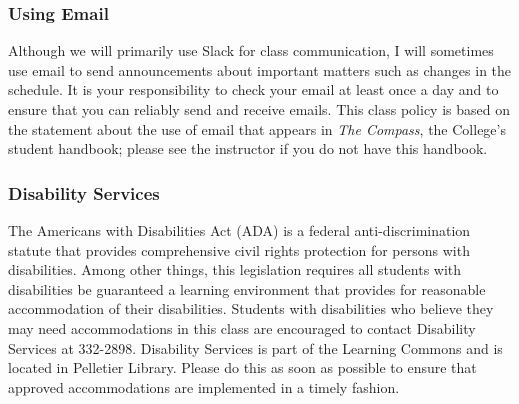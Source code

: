 \documentclass[11pt]{article}
\begin{document}
\subsubsection*{Using Email}

Although we will primarily use Slack for class communication, I will sometimes use email to send announcements about
important matters such as changes in the schedule. It is your responsibility to check your email at least once a day and to
ensure that you can reliably send and receive emails. This class policy is based on the statement about the use of email that
appears in {\em The Compass}, the College's student handbook; please see the instructor if you do not have this
handbook.



\subsubsection*{Disability Services}

The Americans with Disabilities Act (ADA) is a federal anti-discrimination statute that provides comprehensive civil
rights protection for persons with disabilities. Among other things, this legislation requires all students with
disabilities be guaranteed a learning environment that provides for reasonable accommodation of their disabilities.
Students with disabilities who believe they may need accommodations in this class are encouraged to contact Disability
Services at 332-2898. Disability Services is part of the Learning Commons and is located in Pelletier Library.
Please do this as soon as possible to ensure that approved accommodations are implemented in a timely fashion.
\end{document}
